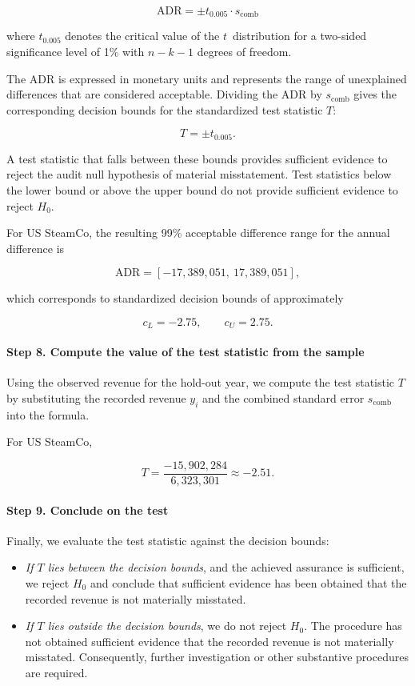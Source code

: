 \begin{equation}
\label{eq:acceptable_difference_range}
\text{ADR} = \pm t_{0.005} \cdot s_{\text{comb}}
\end{equation}

where $t_{0.005}$ denotes the critical value of the $t$~distribution for a two-sided significance level of 1\% with $n-k-1$ degrees of freedom.

\bigskip

The ADR is expressed in monetary units and represents the range of unexplained differences that are considered acceptable. Dividing the ADR by $s_{\text{comb}}$ gives the corresponding decision bounds for the standardized test statistic $T$:

\[
T = \pm t_{0.005}.
\]

A test statistic that falls between these bounds provides sufficient evidence to reject the audit null hypothesis of material misstatement. Test statistics below the lower bound or above the upper bound do not provide sufficient evidence to reject $H_0$.

For US SteamCo, the resulting 99\% acceptable difference range for the annual difference is

\[
\text{ADR} = [-17,389,051,\ 17,389,051],
\]

which corresponds to standardized decision bounds of approximately

\[
c_L = -2.75, \qquad c_U = 2.75.
\]

\paragraph{Step 8. Compute the value of the test statistic from the sample}
Using the observed revenue for the hold-out year, we compute the test statistic $T$ by substituting the recorded revenue $y_i$ and the combined standard error $s_{\text{comb}}$ into the formula.

For US SteamCo,

\[
T = \frac{-15,902,284}{6,323,301} \approx -2.51.
\]

\paragraph{Step 9. Conclude on the test}
Finally, we evaluate the test statistic against the decision bounds:
\begin{itemize}
    \item \emph{If $T$ lies between the decision bounds}, and the achieved assurance is sufficient, we reject $H_0$ and conclude that sufficient evidence has been obtained that the recorded revenue is not materially misstated.
    \item \emph{If $T$ lies outside the decision bounds}, we do not reject $H_0$. The procedure has not obtained sufficient evidence that the recorded revenue is not materially misstated. Consequently, further investigation or other substantive procedures are required.
\end{itemize}

